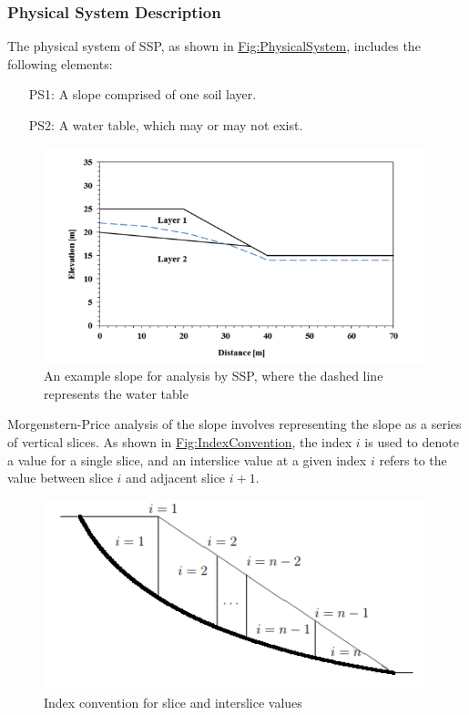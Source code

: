 \documentclass[12pt]{article}
\begin{document}
\subsubsection{Physical System Description}
\label{Sec:PhysSyst}
The physical system of SSP, as shown in \hyperref[Figure:PhysicalSystem]{Fig:PhysicalSystem}, includes the following elements:
\begin{itemize}
\item[PS1:]A slope comprised of one soil layer.
\item[PS2:]A water table, which may or may not exist.
\end{itemize}
\begin{figure}
\begin{center}
\includegraphics[width=\textwidth]{../../../datafiles/SSP/PhysSyst.png}
\caption{An example slope for analysis by SSP, where the dashed line represents the water table}
\label{Figure:PhysicalSystem}
\end{center}
\end{figure}
Morgenstern-Price analysis \cite{morgenstern1965} of the slope involves representing the slope as a series of vertical slices. As shown in \hyperref[Figure:IndexConvention]{Fig:IndexConvention}, the index $i$ is used to denote a value for a single slice, and an interslice value at a given index $i$ refers to the value between slice $i$ and adjacent slice $i+1$.
\begin{figure}
\begin{center}
\includegraphics[width=\textwidth]{../../../datafiles/SSP/IndexConvention.png}
\caption{Index convention for slice and interslice values}
\label{Figure:IndexConvention}
\end{center}
\end{figure}
\end{document}
